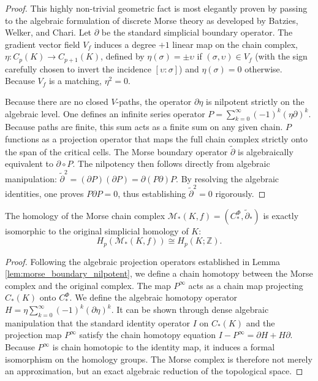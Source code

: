 \begin{proof}
This highly non-trivial geometric fact is most elegantly proven by passing to the algebraic formulation of discrete Morse theory as developed by Batzies, Welker, and Chari. Let $\partial$ be the standard simplicial boundary operator. The gradient vector field $V_f$ induces a degree $+1$ linear map on the chain complex, $\eta : C_p(K) \to C_{p+1}(K)$, defined by $\eta(\sigma) = \pm \upsilon$ if $(\sigma, \upsilon) \in V_f$ (with the sign carefully chosen to invert the incidence $[\upsilon:\sigma]$) and $\eta(\sigma) = 0$ otherwise. Because $V_f$ is a matching, $\eta^2 = 0$.

Because there are no closed $V$-paths, the operator $\partial \eta$ is nilpotent strictly on the algebraic level. One defines an infinite series operator $P = \sum_{k=0}^\infty (-1)^k (\eta \partial)^k$. Because paths are finite, this sum acts as a finite sum on any given chain. $P$ functions as a projection operator that maps the full chain complex strictly onto the span of the critical cells. The Morse boundary operator $\tilde{\partial}$ is algebraically equivalent to $\partial \circ P$. 
The nilpotency then follows directly from algebraic manipulation: $\tilde{\partial}^2 = (\partial P) (\partial P) = \partial (P \partial) P$. By resolving the algebraic identities, one proves $P \partial P = 0$, thus establishing $\tilde{\partial}^2 = 0$ rigorously.
\end{proof}

\begin{theorem}
\label{thm:iso_homology}
The homology of the Morse chain complex $\mathcal{M}_*(K, f) = (C_*^\Phi, \tilde{\partial}_*)$ is exactly isomorphic to the original simplicial homology of $K$:
\[ H_p(\mathcal{M}_*(K, f)) \cong H_p(K; \mathbb{Z}). \]
\end{theorem}

\begin{proof}
Following the algebraic projection operators established in Lemma \ref{lem:morse_boundary_nilpotent}, we define a chain homotopy between the Morse complex and the original complex. The map $P^\infty$ acts as a chain map projecting $C_*(K)$ onto $C_*^\Phi$. We define the algebraic homotopy operator $H = \eta \sum_{k=0}^\infty (-1)^k (\partial \eta)^k$. It can be shown through dense algebraic manipulation that the standard identity operator $I$ on $C_*(K)$ and the projection map $P^\infty$ satisfy the chain homotopy equation $I - P^\infty = \partial H + H \partial$. 
Because $P^\infty$ is chain homotopic to the identity map, it induces a formal isomorphism on the homology groups. The Morse complex is therefore not merely an approximation, but an exact algebraic reduction of the topological space.
\end{proof}

